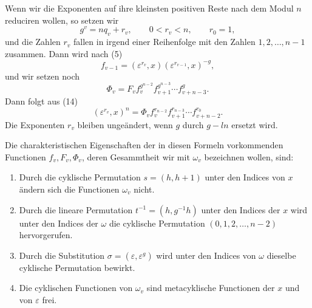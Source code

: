 \documentclass[11pt]{article}
\begin{document}
Wenn wir die Exponenten auf ihre kleinsten positiven Reste nach dem Modul $n$ reduciren wollen, so setzen wir
\begin{equation}\tag{15}
  g^v=nq_v+r_v,\qquad 0<r_v<n,\qquad r_0=1,
\end{equation}
und die Zahlen $r_v$ fallen in irgend einer Reihenfolge mit den Zahlen $1,2,\ldots,n-1$ zusammen. Dann wird nach (5)
\begin{equation}\tag{16}
  f_{v-1}=(\varepsilon^{r_v},x)(\varepsilon^{r_{v-1}},x)^{-g},
\end{equation}
und wir setzen noch
\begin{equation}\tag{17}
  \Phi_v=F_v f_v^{g^{n-2}}f_{v+1}^{g^{n-3}}\cdots f_{v+n-3}^{g}.
\end{equation}
Dann folgt aus (14)
\begin{equation}\tag{18}
  (\varepsilon^{r_v},x)^n=\Phi_v f_v^{r_{n-2}}f_{v+1}^{r_{n-3}}\cdots f_{v+n-2}^{r_0}.
\end{equation}
Die Exponenten $r_v$ bleiben unge\"andert, wenn $g$ durch $g-ln$ ersetzt wird.

Die charakteristischen Eigenschaften der in diesen Formeln vorkommenden Functionen $f_v,F_v,\Phi_v$, deren Gesammtheit wir mit $\omega_v$ bezeichnen wollen, sind:
\begin{enumerate}[label=\alph*)]
\item Durch die cyklische Permutation $s=(h,h+1)$ unter den Indices von $x$ \"andern sich die Functionen $\omega_v$ nicht.
\item Durch die lineare Permutation $t^{-1}=(h,g^{-1}h)$ unter den Indices der $x$ wird unter den Indices der $\omega$ die cyklische Permutation $(0,1,2,\ldots,n-2)$ hervorgerufen.
\item Durch die Substitution $\sigma=(\varepsilon,\varepsilon^g)$ wird unter den Indices von $\omega$ dieselbe cyklische Permutation bewirkt.
\item Die cyklischen Functionen von $\omega_v$ sind metacyklische Functionen der $x$ und von $\varepsilon$ frei.
\end{enumerate}
\end{document}
